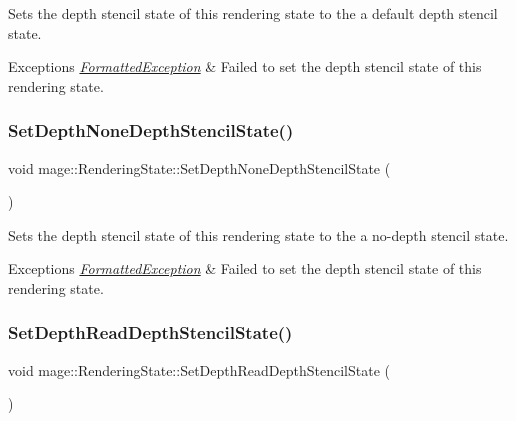 Sets the depth stencil state of this rendering state to the a default depth stencil state.


\begin{DoxyExceptions}{Exceptions}
{\em \hyperlink{structmage_1_1_formatted_exception}{Formatted\+Exception}} & Failed to set the depth stencil state of this rendering state. \\
\hline
\end{DoxyExceptions}
\hypertarget{structmage_1_1_rendering_state_a67db088d08560ab5f3adde28032972a4}{}\label{structmage_1_1_rendering_state_a67db088d08560ab5f3adde28032972a4} 
\subsubsection{\texorpdfstring{Set\+Depth\+None\+Depth\+Stencil\+State()}{SetDepthNoneDepthStencilState()}}
{\footnotesize\ttfamily void mage\+::\+Rendering\+State\+::\+Set\+Depth\+None\+Depth\+Stencil\+State (\begin{DoxyParamCaption}{ }\end{DoxyParamCaption})}

Sets the depth stencil state of this rendering state to the a no-\/depth stencil state.


\begin{DoxyExceptions}{Exceptions}
{\em \hyperlink{structmage_1_1_formatted_exception}{Formatted\+Exception}} & Failed to set the depth stencil state of this rendering state. \\
\hline
\end{DoxyExceptions}
\hypertarget{structmage_1_1_rendering_state_a86ff2bb5739ada7ffcc275f4624d2a24}{}\label{structmage_1_1_rendering_state_a86ff2bb5739ada7ffcc275f4624d2a24} 
\subsubsection{\texorpdfstring{Set\+Depth\+Read\+Depth\+Stencil\+State()}{SetDepthReadDepthStencilState()}}
{\footnotesize\ttfamily void mage\+::\+Rendering\+State\+::\+Set\+Depth\+Read\+Depth\+Stencil\+State (\begin{DoxyParamCaption}{ }\end{DoxyParamCaption})}

